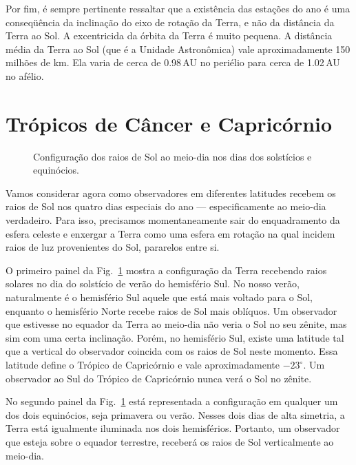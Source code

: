 Por fim, é sempre pertinente ressaltar que a existência das estações do ano é uma conseqüência da inclinação do eixo de rotação da Terra, e não da distância da Terra ao Sol. A excentricida da órbita da Terra é muito pequena. A distância média da Terra ao Sol (que é a Unidade Astronômica) vale aproximadamente 150 milhões de km. Ela varia de cerca de 0.98\,AU no periélio para cerca de 1.02\,AU no afélio.

\section{Trópicos de Câncer e Capricórnio}

\begin{figure}
\centering



\caption{Configuração dos raios de Sol ao meio-dia nos dias dos solstícios e equinócios.}
\label{fig:marcosetembro}
\end{figure}

Vamos considerar agora como observadores em diferentes latitudes recebem os raios de Sol nos quatro dias especiais do ano --- especificamente ao meio-dia verdadeiro. Para isso, precisamos momentaneamente sair do enquadramento da esfera celeste e enxergar a Terra como uma esfera em rotação na qual incidem raios de luz provenientes do Sol, pararelos entre si.

O primeiro painel da Fig.~\ref{fig:marcosetembro} mostra a configuração da Terra recebendo raios solares no dia do solstício de verão do hemisfério Sul. No nosso verão, naturalmente é o hemisfério Sul aquele que está mais voltado para o Sol, enquanto o hemisfério Norte recebe raios de Sol mais oblíquos. Um observador que estivesse no equador da Terra ao meio-dia não veria o Sol no seu zênite, mas sim com uma certa inclinação. Porém, no hemisfério Sul, existe uma latitude tal que a vertical do observador coincida com os raios de Sol neste momento. Essa latitude define o Trópico de Capricórnio e vale aproximadamente $-23^{\circ}$. Um observador ao Sul do Trópico de Capricórnio nunca verá o Sol no zênite.

No segundo painel da Fig.~\ref{fig:marcosetembro} está representada a configuração em qualquer um dos dois equinócios, seja primavera ou verão. Nesses dois dias de alta simetria, a Terra está igualmente iluminada nos dois hemisférios. Portanto, um observador que esteja sobre o equador terrestre, receberá os raios de Sol verticalmente ao meio-dia.

